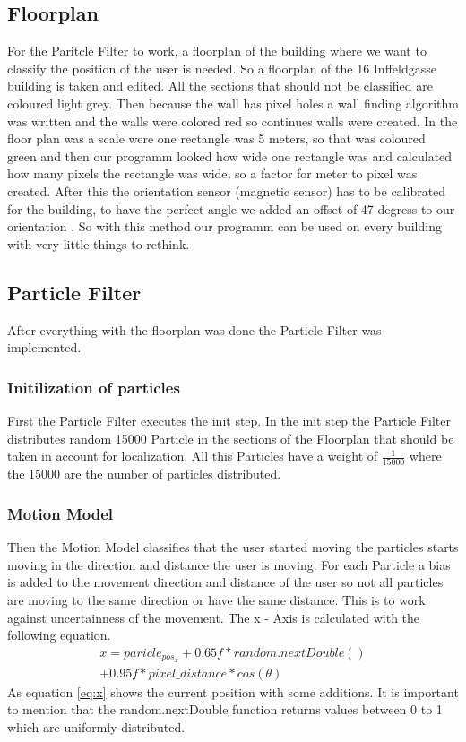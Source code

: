 \documentclass[conference]{IEEEtran}
\begin{document}
\subsection{Floorplan}
For the Paritcle Filter to work, a floorplan of the building where we want to classify the position of the user is needed. So a floorplan of the 16 Inffeldgasse building is taken and edited. All the sections that should not be classified are coloured light grey. Then because the wall has pixel holes a wall finding algorithm was written and the walls were colored red so continues walls were created. In the floor plan was a scale were one rectangle was 5 meters, so that was coloured green and then our programm looked how wide one rectangle was and calculated how many pixels the rectangle was wide, so a factor for meter to pixel was created. After this the orientation sensor (magnetic sensor) has to be calibrated for the building, to have the perfect angle we added an offset of 47 degress to our orientation \cite{b4}. So with this method our programm can be used on every building with very little things to rethink.
 \subsection{Particle Filter}
After everything with the floorplan was done the Particle Filter was implemented. 
\subsubsection{Initilization of particles}
First the Particle Filter executes the init step. In the init step the Particle Filter distributes random 15000 Particle in the sections of the Floorplan that should be taken in account for localization. All this Particles have a weight of $\frac{1}{15000} $ where the 15000 are the number of particles distributed.
\subsubsection{Motion Model}
Then the Motion Model classifies that the user started moving the particles starts moving in the direction and distance the user is moving. For each Particle a bias is added to the movement direction and distance of the user so not all particles are moving to the same direction or have the same distance. This is to work against uncertainness of the movement. The x - Axis is calculated with the following equation.
\begin{equation*}\label{eq:x}
\begin{aligned}
x = paricle_{pos_x} + 0.65f * random.nextDouble() \\ + 0.95f * pixel\_distance * cos(\theta)
\end{aligned}
\end{equation*}
As equation \ref{eq:x} shows the current position with some additions. It is important to mention that the random.nextDouble function returns values between 0 to 1 which are uniformly distributed. 
\end{document}
